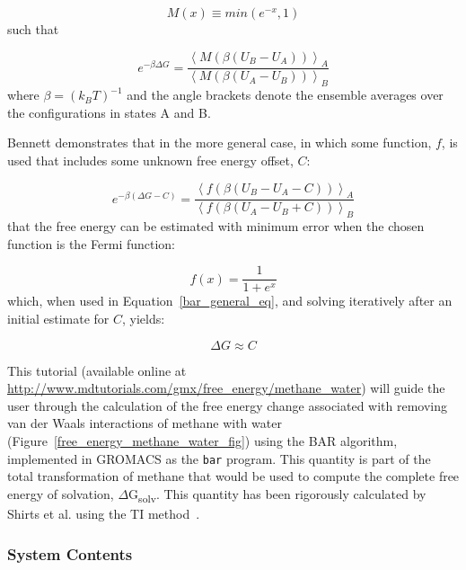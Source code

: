 \documentclass[9pt,tutorial,pubversion]{livecoms}
\newcommand{\urlstring}{http://www.mdtutorials.com/gmx}
\newcommand{\tutorialvdw}{\url{\urlstring/free_energy/methane_water}}
\begin{document}
\begin{equation} \label{metropolis_eq}
M(x) \equiv min(e^{-x}, 1)
\end{equation}
%
such that

\begin{equation} \label{bar_simplest_eq}
e^{-\beta\Delta G} = \frac{\left\langle M\left(\beta\left(U_B - U_A\right)\right)\right\rangle_A}{\left\langle M\left(\beta\left(U_A - U_B\right)\right)\right\rangle_B}
\end{equation}
%
where $\beta = (k_B T)^{-1}$ and the angle brackets denote the ensemble averages over the configurations in states A and B.

Bennett demonstrates that in the more general case, in which some function, $f$, is used that includes some unknown free energy offset, $C$:

\begin{equation} \label{bar_general_eq}
e^{-\beta(\Delta G - C)} = \frac{\left\langle f\left(\beta\left(U_B - U_A - C\right)\right)\right\rangle_A}{\left\langle f\left(\beta\left(U_A - U_B + C\right)\right)\right\rangle_B}
\end{equation}
%
that the free energy can be estimated with minimum error when the chosen function is the Fermi function:

\begin{equation} \label{bar_fermi_eq}
f(x) = \frac{1}{1 + e^x}
\end{equation}
%
which, when used in Equation~\ref{bar_general_eq}, and solving iteratively after an initial estimate for $C$, yields:

\begin{equation} \label{bar_final_eq}
\Delta G \approx C
\end{equation}

This tutorial (available online at \tutorialvdw) will guide the user through the calculation of the free energy change associated with removing van der Waals interactions of methane with water (Figure~\ref{free_energy_methane_water_fig}) using the BAR algorithm, implemented in GROMACS as the \texttt{bar} program. This quantity is part of the total transformation of methane that would be used to compute the complete free energy of solvation, $\Delta$G\textsubscript{solv}. This quantity has been rigorously calculated by Shirts et al. using the TI method~\cite{Shirts2003}.

\subsubsection{System Contents} \label{vdw_top}
\end{document}
